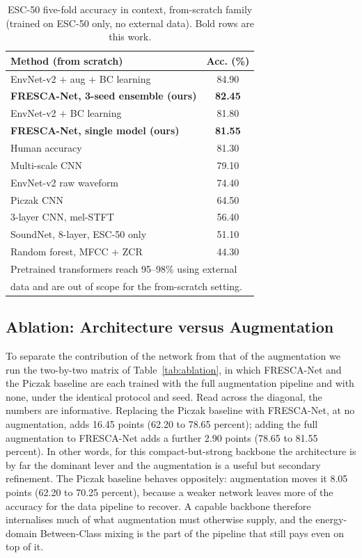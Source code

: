 \documentclass[conference]{IEEEtran}
\begin{document}
\begin{table}[t]
\caption{ESC-50 five-fold accuracy in context, from-scratch family (trained on ESC-50 only, no external data). Bold rows are this work.}
\label{tab:bench}
\begin{center}
\renewcommand{\arraystretch}{1.12}
\begin{tabular}{|l|c|}
\hline
\textbf{Method (from scratch)} & \textbf{Acc. (\%)} \\
\hline
EnvNet-v2 $+$ aug $+$ BC learning \cite{tokozume_bc} & 84.90 \\
\textbf{FRESCA-Net, 3-seed ensemble (ours)} & \textbf{82.45} \\
EnvNet-v2 $+$ BC learning \cite{tokozume_bc} & 81.80 \\
\textbf{FRESCA-Net, single model (ours)} & \textbf{81.55} \\
Human accuracy \cite{piczak_dataset} & 81.30 \\
Multi-scale CNN \cite{zhu_multiscale} & 79.10 \\
EnvNet-v2 raw waveform \cite{tokozume_envnet} & 74.40 \\
Piczak CNN \cite{piczak_cnn} & 64.50 \\
3-layer CNN, mel-STFT \cite{huzaifah_tf} & 56.40 \\
SoundNet, 8-layer, ESC-50 only \cite{aytar_soundnet} & 51.10 \\
Random forest, MFCC $+$ ZCR \cite{piczak_dataset} & 44.30 \\
\hline
\multicolumn{2}{l}{\footnotesize Pretrained transformers reach 95--98\% using external} \\
\multicolumn{2}{l}{\footnotesize data \cite{kong_panns,gong_ast,chen_beats,elizalde_clap} and are out of scope for the from-scratch setting.} \\
\end{tabular}
\end{center}
\end{table}

\subsection{Ablation: Architecture versus Augmentation}
To separate the contribution of the network from that of the augmentation we run the two-by-two matrix of Table~\ref{tab:ablation}, in which FRESCA-Net and the Piczak baseline are each trained with the full augmentation pipeline and with none, under the identical protocol and seed. Read across the diagonal, the numbers are informative. Replacing the Piczak baseline with FRESCA-Net, at no augmentation, adds 16.45 points (62.20 to 78.65 percent); adding the full augmentation to FRESCA-Net adds a further 2.90 points (78.65 to 81.55 percent). In other words, for this compact-but-strong backbone the architecture is by far the dominant lever and the augmentation is a useful but secondary refinement. The Piczak baseline behaves oppositely: augmentation moves it 8.05 points (62.20 to 70.25 percent), because a weaker network leaves more of the accuracy for the data pipeline to recover. A capable backbone therefore internalises much of what augmentation must otherwise supply, and the energy-domain Between-Class mixing is the part of the pipeline that still pays even on top of it.
\end{document}
